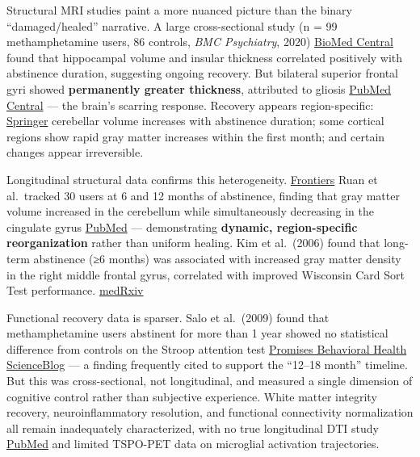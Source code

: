 Structural MRI studies paint a more nuanced picture than the binary ``damaged/healed'' narrative. A large cross-sectional study (n = 99 methamphetamine users, 86 controls, \emph{BMC Psychiatry}, 2020) \href{https://bmcpsychiatry.biomedcentral.com/articles/10.1186/s12888-020-02567-3}{BioMed Central} found that hippocampal volume and insular thickness correlated positively with abstinence duration, suggesting ongoing recovery. But bilateral superior frontal gyri showed \textbf{permanently greater thickness}, attributed to gliosis \href{https://pmc.ncbi.nlm.nih.gov/articles/PMC7146984/}{PubMed Central} --- the brain's scarring response. Recovery appears region-specific: \href{https://link.springer.com/article/10.1186/s12888-020-02567-3}{Springer} cerebellar volume increases with abstinence duration; some cortical regions show rapid gray matter increases within the first month; and certain changes appear irreversible.

Longitudinal structural data confirms this heterogeneity. \href{https://www.frontiersin.org/journals/psychiatry/articles/10.3389/fpsyt.2018.00722/full}{Frontiers} Ruan et al.~tracked 30 users at 6 and 12 months of abstinence, finding that gray matter volume increased in the cerebellum while simultaneously decreasing in the cingulate gyrus \href{https://pubmed.ncbi.nlm.nih.gov/28887180/}{PubMed} --- demonstrating \textbf{dynamic, region-specific reorganization} rather than uniform healing. Kim et al.~(2006) found that long-term abstinence (≥6 months) was associated with increased gray matter density in the right middle frontal gyrus, correlated with improved Wisconsin Card Sort Test performance. \href{https://www.medrxiv.org/content/10.1101/2025.02.11.25322099v1.full}{medRxiv}

Functional recovery data is sparser. Salo et al.~(2009) found that methamphetamine users abstinent for more than 1 year showed no statistical difference from controls on the Stroop attention test \href{https://www.promises.com/addiction-blog/brain-function-can-recover-after-a-year-of-abstinence-from-methamphetamine/}{Promises Behavioral Health} \href{https://scienceblog.com/22706/attention-recovering-meth-heads-impulse-control-returns-after-a-year-gut-it-out-until-then/}{ScienceBlog} --- a finding frequently cited to support the ``12--18 month'' timeline. But this was cross-sectional, not longitudinal, and measured a single dimension of cognitive control rather than subjective experience. White matter integrity recovery, neuroinflammatory resolution, and functional connectivity normalization all remain inadequately characterized, with no true longitudinal DTI study \href{https://pubmed.ncbi.nlm.nih.gov/31176066/}{PubMed} and limited TSPO-PET data on microglial activation trajectories.

